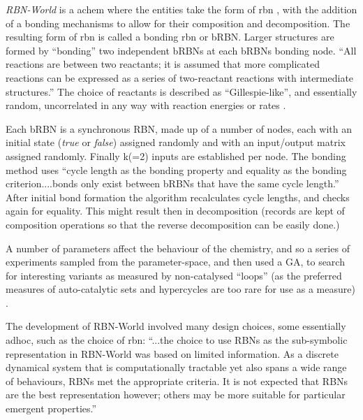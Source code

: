 
\emph{RBN-World} \parencite{Faulconbridge2011} is a \gls{achem} where the entities take the form of \gls{rbn} \parencite{Kauffman:1969ne}, with the addition of a bonding mechanisms to allow for their composition and decomposition. The resulting form of \gls{rbn} is called a bonding \gls{rbn} or bRBN.  Larger structures are formed by ``bonding'' two independent bRBNs at each bRBNs bonding node. ``All reactions are between two reactants; it is assumed that more complicated reactions can be expressed as a series of two-reactant reactions with intermediate structures.'' The choice of reactants is described as ``Gillespie-like'', and essentially random, uncorrelated in any way with reaction energies or rates \parencite[chap.8]{Faulconbridge2011}.

Each bRBN is a synchronous RBN, made up of a number of nodes, each with an initial state (\emph{true} or \emph{false}) assigned randomly and with an input/output matrix assigned randomly. Finally k(=2) inputs are established per node. The bonding method uses ``cycle length as the bonding property and equality as the bonding criterion....bonds only exist between bRBNs that have the same cycle length.'' After initial bond formation the algorithm recalculates cycle lengths, and checks again for equality. This might result then in decomposition (records are kept of composition operations so that the reverse decomposition can be easily done.)

A number of parameters affect the behaviour of the chemistry, and so a series of experiments sampled from the parameter-space, and then used a GA, to search for interesting variants as measured by non-catalysed ``loops'' (as the preferred measures of auto-catalytic sets and hypercycles are too rare for use as a measure) \parencite[chap.8]{Faulconbridge2011}. 

The development of RBN-World involved many design choices, some essentially adhoc, such as the choice of \gls{rbn}: ``...the choice to use RBNs as the sub-symbolic representation in RBN-World was based on limited information. As a discrete dynamical system that is computationally tractable yet also spans a wide range of behaviours, RBNs met the appropriate criteria. It is not expected that RBNs are the best representation however; others may be more suitable for particular emergent properties.''

